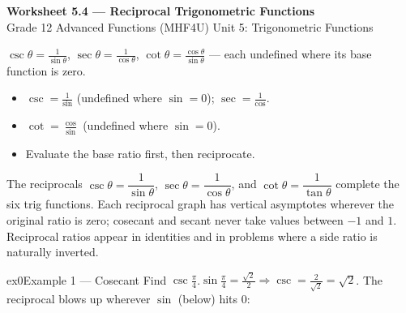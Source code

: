\documentclass[11pt]{article}
\begin{document}
\begin{center}
{\LARGE\bfseries\color{titleblue}Worksheet 5.4 --- Reciprocal Trigonometric Functions}\\[2pt]
{\small Grade 12 Advanced Functions (MHF4U) \textperiodcentered{} Unit 5: Trigonometric Functions}
\end{center}

\begin{ideabox}
$\csc\theta=\tfrac1{\sin\theta}$, $\sec\theta=\tfrac1{\cos\theta}$, $\cot\theta=\tfrac{\cos\theta}{\sin\theta}$ — each undefined where its base function is zero.
\begin{itemize}[leftmargin=*,itemsep=2pt]
  \item $\csc=\tfrac1{\sin}$ (undefined where $\sin=0$); $\sec=\tfrac1{\cos}$.
  \item $\cot=\tfrac{\cos}{\sin}$ (undefined where $\sin=0$).
  \item Evaluate the base ratio first, then reciprocate.
\end{itemize}
\end{ideabox}

\begin{learnbox}
The reciprocals $\csc\theta=\dfrac{1}{\sin\theta}$, $\sec\theta=\dfrac{1}{\cos\theta}$, and $\cot\theta=\dfrac{1}{\tan\theta}$ complete the six trig functions.
Each reciprocal graph has vertical asymptotes wherever the original ratio is zero; cosecant and secant never take values between $-1$ and $1$.
Reciprocal ratios appear in identities and in problems where a side ratio is naturally inverted.
\end{learnbox}


\begin{example}{ex0}{Example 1 --- Cosecant}
Find $\csc\tfrac{\pi}{4}$.\soln $\sin\tfrac{\pi}{4}=\tfrac{\sqrt2}{2}\Rightarrow\csc=\tfrac{2}{\sqrt2}=\sqrt2$. The reciprocal blows up wherever $\sin$ (below) hits 0:\begin{center}\end{center}
\end{example}
\end{document}
